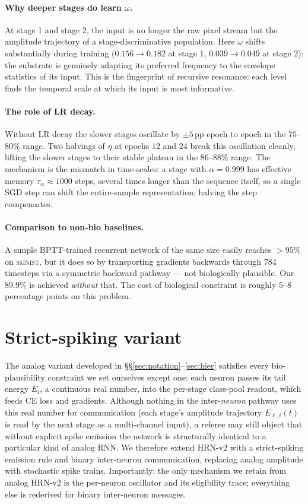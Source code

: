 \documentclass[11pt]{article}
\begin{document}
\paragraph{Why deeper stages do learn $\omega$.}
At stage 1 and stage 2, the input is no longer the raw pixel stream but
the amplitude trajectory of a stage-discriminative population. Here
$\omega$ shifts substantially during training ($0.156 \to 0.182$ at
stage 1, $0.039 \to 0.049$ at stage 2): the substrate is genuinely
adapting its preferred frequency to the envelope statistics of its
input. This is the fingerprint of recursive resonance: each level finds
the temporal scale at which its input is most informative.

\paragraph{The role of LR decay.}
Without LR decay the slower stages oscillate by $\pm 5$\,pp epoch to
epoch in the $75$--$80\%$ range. Two halvings of $\eta$ at epochs $12$
and $24$ break this oscillation cleanly, lifting the slower stages to
their stable plateau in the $86$--$88\%$ range. The mechanism is the
mismatch in time-scales: a stage with $\alpha = 0.999$ has effective
memory $\tau_\alpha \approx 1000$ steps, several times longer than the
sequence itself, so a single SGD step can shift the entire-sample
representation; halving the step compensates.

\paragraph{Comparison to non-bio baselines.}
A simple BPTT-trained recurrent network of the same size easily reaches
$> 95\%$ on \textsc{smnist}, but it does so by transporting gradients
backwards through 784 timesteps via a symmetric backward pathway --- not
biologically plausible.  Our $89.9\%$ is achieved \emph{without} that.
The cost of biological constraint is roughly $5$--$8$ percentage points
on this problem.

\section{Strict-spiking variant}\label{sec:spiking}

The analog variant developed in \S\S\ref{sec:notation}--\ref{sec:hier} satisfies
every bio-plausibility constraint we set ourselves except one: each
neuron passes its tail energy $\bar E_i$, a continuous real number,
into the per-stage class-pool readout, which feeds CE loss and
gradients. Although nothing in the inter-\emph{neuron} pathway uses
this real number for communication (each stage's amplitude trajectory
$E_{\ell, i}(t)$ is read by the next stage as a multi-channel input),
a referee may still object that without explicit spike emission the
network is structurally identical to a particular kind of analog RNN.
We therefore extend HRN-v2 with a strict-spiking emission rule and
binary inter-neuron communication, replacing analog amplitude with
stochastic spike trains. Importantly: the only mechanism we retain
from analog HRN-v2 is the per-neuron oscillator and its eligibility
trace; everything else is rederived for binary inter-neuron messages.
\end{document}
